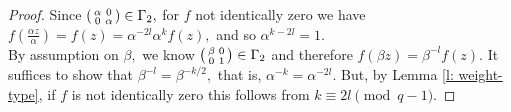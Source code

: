 \documentclass[11pt]{amsart}
\theoremstyle{definition}
\newenvironment{psmallmatrix}
{\left(\begin{smallmatrix}}
	{\end{smallmatrix}\right)}
\numberwithin{equation}{section}
\newcommand{\bbF}{\mathbb{F}}		%
\newcommand{\Mod}[1]{\ (\mathrm{mod}\ #1)}
\begin{document}
\begin{proof}
Since $\displaystyle{\begin{psmallmatrix}\alpha&0\\0&\alpha\end{psmallmatrix}\in \Gamma_2},$ for $f$ not identically zero we have $\displaystyle{f\left(\frac{\alpha z}{\alpha}\right) = f(z)=\alpha^{-2l}\alpha^k f(z)},$ and so 
$\alpha^{k-2l}=1.$\\

%

By assumption on $\beta,$ we know $\begin{psmallmatrix}\beta&0\\0&1\end{psmallmatrix}\in \Gamma_2$ and therefore $f(\beta z)=\beta^{-l}f(z).$ It suffices to show that $\beta^{-l}=\beta^{-k/2},$ that is, $\alpha^{-k}=\alpha^{-2l}.$ But, by Lemma \ref{l: weight-type}, if $f$ is not identically zero this follows from $k\equiv 2l\pmod{q-1}.$ 
\end{proof}
\end{document}
